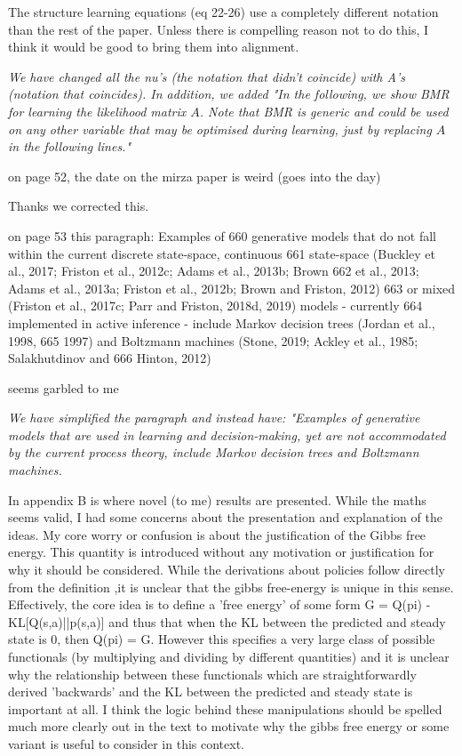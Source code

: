 \documentclass{article}
\begin{document}
The structure learning equations (eq 22-26) use a completely different notation than the rest of the paper. Unless there is compelling reason not to do this, I think it would be good to bring them into alignment.

\textit{We have changed all the nu's (the notation that didn't coincide) with A's (notation that coincides). In addition, we added "In the following, we show BMR for learning the likelihood matrix $A$. Note that BMR is generic and could be used on any other variable that may be optimised during learning, just by replacing $A$ in the following lines."}

on page 52, the date on the mirza paper is weird (goes into the day)

Thanks we corrected this.

on page 53 this paragraph:
Examples of
660 generative models that do not fall within the current discrete state-space, continuous
661 state-space (Buckley et al., 2017; Friston et al., 2012c; Adams et al., 2013b; Brown
662 et al., 2013; Adams et al., 2013a; Friston et al., 2012b; Brown and Friston, 2012)
663 or mixed (Friston et al., 2017c; Parr and Friston, 2018d, 2019) models - currently
664 implemented in active inference - include Markov decision trees (Jordan et al., 1998,
665 1997) and Boltzmann machines (Stone, 2019; Ackley et al., 1985; Salakhutdinov and
666 Hinton, 2012)

seems garbled to me

\textit{We have simplified the paragraph and instead have: "Examples of generative models that are used in learning and decision-making, yet are not accommodated by the current process theory, include Markov decision trees and Boltzmann machines.}

In appendix B is where novel (to me) results are presented. While the maths seems valid, I had some concerns about the presentation and explanation of the ideas. My core worry or confusion is about the justification of the Gibbs free energy. This quantity is introduced without any motivation or justification for why it should be considered. While the derivations about policies follow directly from the definition ,it is unclear that the gibbs free-energy is unique in this sense. Effectively, the core idea is to define a 'free energy' of some form G = Q(pi) - KL[Q(s,a)||p(s,a)] and thus that when the KL between the predicted and steady state is 0, then Q(pi) = G. However this specifies a very large class of possible functionals (by multiplying and dividing by different quantities) and it is unclear why the relationship between these functionals which are straightforwardly derived 'backwards' and the KL between the predicted and steady state is important at all. I think the
logic behind these manipulations should be spelled much more clearly out in the text to motivate why the gibbs free energy or some variant is useful to consider in this context.
\end{document}

